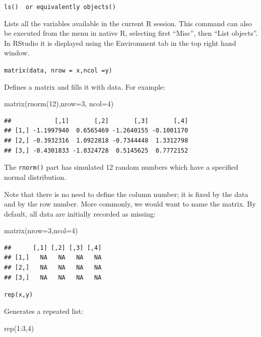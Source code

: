 \documentclass[
]{book}
\newenvironment{Shaded}{\begin{snugshade}}{\end{snugshade}}
\newcommand{\AttributeTok}[1]{\textcolor[rgb]{0.77,0.63,0.00}{#1}}
\newcommand{\DecValTok}[1]{\textcolor[rgb]{0.00,0.00,0.81}{#1}}
\newcommand{\FunctionTok}[1]{\textcolor[rgb]{0.00,0.00,0.00}{#1}}
\newcommand{\NormalTok}[1]{#1}
\newcommand{\SpecialCharTok}[1]{\textcolor[rgb]{0.00,0.00,0.00}{#1}}
\begin{document}
\texttt{ls()\ \ or\ equivalently\ objects()}

Lists all the variables available in the current R session. This command can also be executed from the menu in native R, selecting first ``Misc'', then ``List objects''. In RStudio it is displayed using the Environment tab in the top right hand window.

\texttt{matrix(data,\ nrow\ =\ x,ncol\ =y)}

Defines a matrix and fills it with data. For example:

\begin{Shaded}
\begin{Highlighting}[]
\FunctionTok{matrix}\NormalTok{(}\FunctionTok{rnorm}\NormalTok{(}\DecValTok{12}\NormalTok{),}\AttributeTok{nrow=}\DecValTok{3}\NormalTok{, }\AttributeTok{ncol=}\DecValTok{4}\NormalTok{)}
\end{Highlighting}
\end{Shaded}

\begin{verbatim}
##            [,1]       [,2]       [,3]       [,4]
## [1,] -1.1997940  0.6565469 -1.2640155 -0.1001170
## [2,] -0.3932316  1.0922818 -0.7344448  1.3312798
## [3,] -0.4301833 -1.0324728  0.5145625  0.7772152
\end{verbatim}

The \texttt{rnorm()} part has simulated 12 random numbers which have a specified normal distribution.

Note that there is no need to define the column number; it is fixed by the data and by the row number. More commonly, we would want to name the matrix. By default, all data are initially recorded as missing:

\begin{Shaded}
\begin{Highlighting}[]
\FunctionTok{matrix}\NormalTok{(}\AttributeTok{nrow=}\DecValTok{3}\NormalTok{,}\AttributeTok{ncol=}\DecValTok{4}\NormalTok{)}
\end{Highlighting}
\end{Shaded}

\begin{verbatim}
##      [,1] [,2] [,3] [,4]
## [1,]   NA   NA   NA   NA
## [2,]   NA   NA   NA   NA
## [3,]   NA   NA   NA   NA
\end{verbatim}

\texttt{rep(x,y)}

Generates a repeated list:

\begin{Shaded}
\begin{Highlighting}[]
\FunctionTok{rep}\NormalTok{(}\DecValTok{1}\SpecialCharTok{:}\DecValTok{3}\NormalTok{,}\DecValTok{4}\NormalTok{)}
\end{Highlighting}
\end{Shaded}
\end{document}
